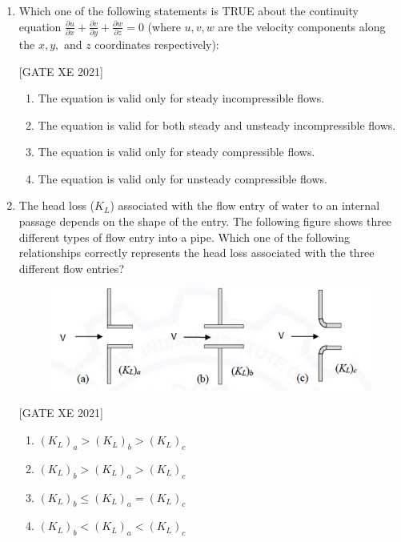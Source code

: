 \documentclass[journal,12pt,onecolumn]{IEEEtran}
\theoremstyle{remark}
\begin{document}
\begin{enumerate}
\vspace{0.8\baselineskip}

\item Which one of the following statements is TRUE about the continuity equation
$\displaystyle \frac{\partial u}{\partial x}+\frac{\partial v}{\partial y}+\frac{\partial w}{\partial z}=0$
(where $u, v, w$ are the velocity components along the $x, y,$ and $z$ coordinates respectively):


\hfill[GATE XE 2021]


\begin{multicols}{2}
\begin{enumerate}
\item The equation is valid only for steady incompressible flows.
\item The equation is valid for both steady and unsteady incompressible flows.
\item The equation is valid only for steady compressible flows.
\item The equation is valid only for unsteady compressible flows.
\end{enumerate}
\end{multicols}

\vspace{0.8\baselineskip}

\item The head loss ($K_L$) associated with the flow entry of water to an internal passage depends on the shape of the entry. The following figure shows three different types of flow entry into a pipe. Which one of the following relationships correctly represents the head loss associated with the three different flow entries?
\begin{figure}[H]
      \centering
      \includegraphics[width=0.5\columnwidth]{figs/fig6.png}
      \caption{}
      \label{fig:placeholder}
  \end{figure}

\hfill[GATE XE 2021]


\begin{multicols}{2}
\begin{enumerate}
\item $(K_L)_a > (K_L)_b > (K_L)_c$
\item $(K_L)_b > (K_L)_a > (K_L)_c$
\item $(K_L)_b \le (K_L)_a = (K_L)_c$
\item $(K_L)_b < (K_L)_a < (K_L)_c$
\end{enumerate}
\end{multicols}


\end{enumerate}
\end{document}
